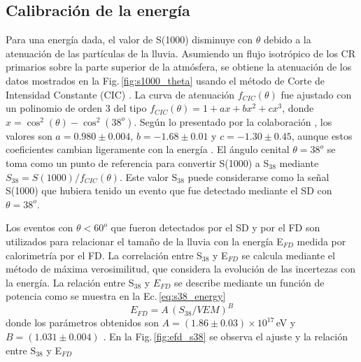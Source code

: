 \subsection{Calibración de la energía}

Para una energía dada, el valor de S(1000) disminuye con $\theta$ debido a la atenuación de las partículas de la lluvia. Asumiendo un flujo isotrópico de los CR primarios sobre la parte superior de la atmósfera, se obtiene la atenuación de los datos mostrados en la Fig.\,\ref{fig:s1000_theta}  usando el método de Corte de Intensidad Constante (CIC) \cite{CIC}. La curva de atenuación $f_{CIC}(\theta)$ fue ajustado con un polinomio de orden 3 del tipo $f_{CIC}(\theta)=1+ax+bx^2+cx^3$, donde $x=\cos^2(\theta) - \cos^2(38^o)$. Según lo presentado por la colaboración \cite{collaboration2013pierre}, los valores son $a=0.980\pm0.004$, $b=-1.68\pm0.01$ y $c=-1.30\pm 0.45$, aunque estos coeficientes cambian ligeramente con la energía \cite{data}. El ángulo cenital $\theta=38^o$ se toma como un punto de referencia para convertir S(1000) a S$_{38}$ mediante $S_{38}=S(1000)/f_{CIC}(\theta)$. Este valor S$_{38}$ puede considerarse como la señal S(1000) que hubiera tenido un evento que fue detectado mediante el SD con $\theta=38^o$.

Los eventos con $\theta<60^o$  que fueron detectados por el SD y por el FD son utilizados para relacionar el tamaño de la lluvia con la energía  E$_{FD}$ medida por calorimetría por el FD.  La correlación entre S$_{38}$ y E$_{FD}$ se calcula mediante el método de máxima verosimilitud, que considera la evolución de las incertezas con la energía. La relación entre S$_{38}$ y $E_{FD}$ se describe mediante un función de potencia como se muestra en la Ec.\,\ref{eq:s38_energy}
\begin{equation}
	E_{FD}= A\, (S_{38}/VEM)^B
	\label{eq:s38_energy}
\end{equation}
donde los parámetros obtenidos son $A=(1.86\pm0.03)\times 10^{17}\,$eV y $B=(1.031\pm0.004)$  \cite{tobepublished}. En la Fig.\,\ref{fig:efd_s38} se observa el ajuste y la relación entre  S$_{38}$ y E$_{FD}$


